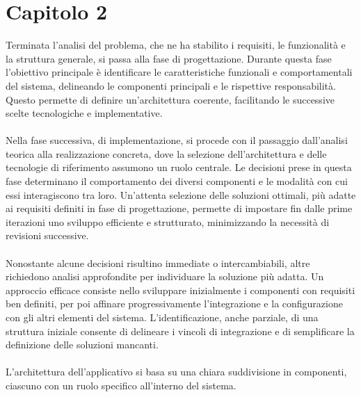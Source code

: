 \chapter{Capitolo 2}

Terminata l'analisi del problema, che ne ha stabilito i requisiti,
le funzionalità e la struttura generale,
si passa alla fase di progettazione.
Durante questa fase l'obiettivo principale è identificare
le caratteristiche funzionali e comportamentali del sistema,
delineando le componenti principali e le rispettive responsabilità.
Questo permette di definire un'architettura coerente,
facilitando le successive scelte tecnologiche e implementative.\\
\\
Nella fase successiva, di implementazione,
si procede con il passaggio dall'analisi teorica alla realizzazione concreta,
dove la selezione dell'architettura e delle tecnologie di riferimento assumono un ruolo centrale.
Le decisioni prese in questa fase determinano il comportamento dei diversi componenti e
le modalità con cui essi interagiscono tra loro.
Un'attenta selezione delle soluzioni ottimali,
più adatte ai requisiti definiti in fase di progettazione,
permette di impostare fin dalle prime iterazioni uno sviluppo efficiente e strutturato,
minimizzando la necessità di revisioni successive.\\
\\
Nonostante alcune decisioni risultino immediate o intercambiabili,
altre richiedono analisi approfondite per individuare la soluzione più adatta.
Un approccio efficace consiste nello sviluppare inizialmente i componenti con requisiti ben definiti,
per poi affinare progressivamente l'integrazione e la configurazione con gli altri elementi del sistema.
L'identificazione, anche parziale, di una struttura iniziale
consente di delineare i vincoli di integrazione e
di semplificare la definizione delle soluzioni mancanti.\\
\\
L'architettura dell'applicativo si basa su una chiara suddivisione in componenti,
ciascuno con un ruolo specifico all'interno del sistema.
\\

